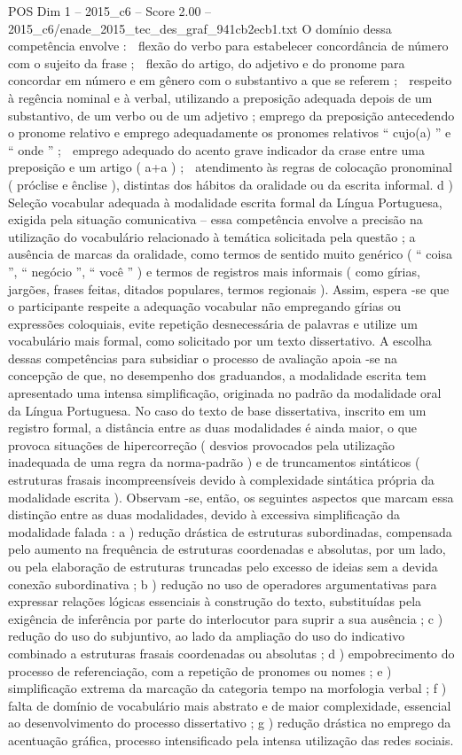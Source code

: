 \begin{textsample}{POS Dim 1 – 2015\_c6 – Score 2.00 – 2015\_c6/enade\_2015\_tec\_des\_graf\_941cb2ecb1.txt}
O domínio dessa competência envolve :  flexão do verbo para estabelecer concordância de número com o sujeito da frase ;  flexão do artigo, do adjetivo e do pronome para concordar em número e em gênero com o substantivo a que se referem ;  respeito à regência nominal e à verbal, utilizando a preposição adequada depois de um substantivo, de um verbo ou de um adjetivo ; emprego da preposição antecedendo o pronome relativo e emprego adequadamente os pronomes relativos “ cujo(a) ” e “ onde ” ;  emprego adequado do acento grave indicador da crase entre uma preposição e um artigo ( a+a ) ;  atendimento às regras de colocação pronominal ( próclise e ênclise ), distintas dos hábitos da oralidade ou da escrita informal. d ) Seleção vocabular adequada à modalidade escrita formal da Língua Portuguesa, exigida pela situação comunicativa – essa competência envolve a precisão na utilização do vocabulário relacionado à temática solicitada pela questão ; a ausência de marcas da oralidade, como termos de sentido muito genérico ( “ coisa ”, “ negócio ”, “ você ” ) e termos de registros mais informais ( como gírias, jargões, frases feitas, ditados populares, termos regionais ).
Assim, espera -se que o participante respeite a adequação vocabular não empregando gírias ou expressões coloquiais, evite repetição desnecessária de palavras e utilize um vocabulário mais formal, como solicitado por um texto dissertativo.
A escolha dessas competências para subsidiar o processo de avaliação apoia -se na concepção de que, no desempenho dos graduandos, a modalidade escrita tem apresentado uma intensa simplificação, originada no padrão da modalidade oral da Língua Portuguesa.
No caso do texto de base dissertativa, inscrito em um registro formal, a distância entre as duas modalidades é ainda maior, o que provoca situações de hipercorreção ( desvios provocados pela utilização inadequada de uma regra da norma-padrão ) e de truncamentos sintáticos ( estruturas frasais incompreensíveis devido à complexidade sintática própria da modalidade escrita ).
Observam -se, então, os seguintes aspectos que marcam essa distinção entre as duas modalidades, devido à excessiva simplificação da modalidade falada : a ) redução drástica de estruturas subordinadas, compensada pelo aumento na frequência de estruturas coordenadas e absolutas, por um lado, ou pela elaboração de estruturas truncadas pelo excesso de ideias sem a devida conexão subordinativa ; b ) redução no uso de operadores argumentativas para expressar relações lógicas essenciais à construção do texto, substituídas pela exigência de inferência por parte do interlocutor para suprir a sua ausência ; c ) redução do uso do subjuntivo, ao lado da ampliação do uso do indicativo combinado a estruturas frasais coordenadas ou absolutas ; d ) empobrecimento do processo de referenciação, com a repetição de pronomes ou nomes ; e ) simplificação extrema da marcação da categoria tempo na morfologia verbal ; f ) falta de domínio de vocabulário mais abstrato e de maior complexidade, essencial ao desenvolvimento do processo dissertativo ; g ) redução drástica no emprego da acentuação gráfica, processo intensificado pela intensa utilização das redes sociais.

\end{textsample}
